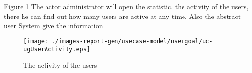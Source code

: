 \begin{usecase}

\end{usecase} 


Figure \ref{fig:lu.uni.lassy.excalibur.examples.icrash-RE-UCD-uc-ugUserActivity}
The actor administrator will open the statistic. the activity of the users, there he can find out how many users are active at any time. Also the abstract user System give the information 

\begin{figure}[htbp]
\begin{center}

\texttt{[image: ./images-report-gen/usecase-model/usergoal/uc-ugUserActivity.eps]}
\end{center}
\caption[lu.uni.lassy.excalibur.examples.icrash Use Case Diagram: uc-ugUserActivity]{The activity of the users}
\label{fig:lu.uni.lassy.excalibur.examples.icrash-RE-UCD-uc-ugUserActivity}
\end{figure}
\vspace{0.5cm}
